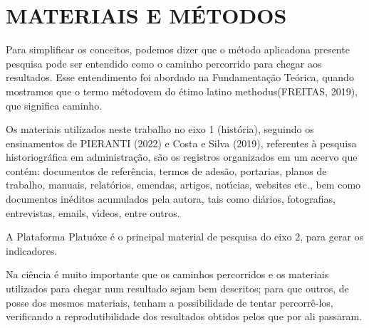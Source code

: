 \documentclass[
12pt,		%
openright,	%
twoside,  %
a4paper,			%
chapter=TITLE,		%
english,			%
french,				%
spanish,			%
brazil				%
]{USPSC-classe/USPSC}
\begin{document}
\chapter[MATERIAIS E M\'ETODOS]{MATERIAIS E M\'ETODOS}\label{MATERIAIS E M\'ETODOS}
Para simplificar os conceitos, podemos dizer que o \textquotedbl m\'etodo aplicado\textquotedbl  na presente pesquisa pode ser entendido como o \textquotedbl caminho percorrido \textquotedbl  para chegar aos resultados. Esse entendimento  foi abordado  na Fundamenta\c{c}\~ao Te\'orica, quando mostramos que o termo \textquotedbl m\'etodo\textquotedbl  vem do \'etimo latino \textquotedbl methodus\textquotedbl   (FREITAS, 2019), que significa \textquotedbl caminho\textquotedbl .

















Os materiais utilizados neste trabalho no eixo 1 (hist\'oria), seguindo os ensinamentos de  PIERANTI (2022) e  Costa e Silva (2019), referentes \`a pesquisa historiogr\'afica em administra\c{c}\~ao,  s\~ao os registros organizados em um acervo que cont\'em: documentos de refer\^encia, termos de ades\~ao, portarias, planos de trabalho, manuais, relat\'orios, emendas, artigos, not\'{\i}cias, websites etc., bem como documentos in\'editos acumulados pela autora, tais como di\'arios, fotografias, entrevistas, emails, v\'{\i}deos, entre outros.

















A Plataforma Platu\'oxe \'e o principal material de pesquisa do eixo 2, para gerar os indicadores.

















Na ci\^encia \'e muito importante que os caminhos percorridos e os materiais utilizados para chegar num resultado sejam bem descritos; para que outros, de posse dos mesmos materiais, tenham a possibilidade de tentar percorr\^e-los, verificando a reprodutibilidade dos resultados obtidos pelos que por ali passaram.
\end{document}
